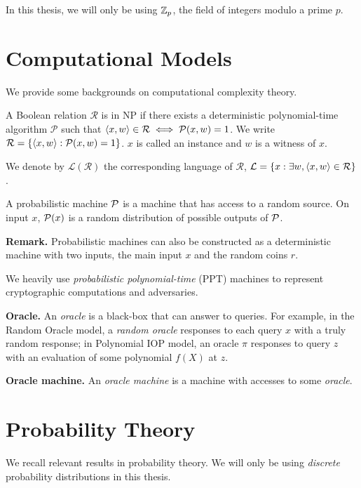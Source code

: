 In this thesis, we will only be using $\mathbb{Z}_p$, the field of integers modulo a prime $p$.

\section{Computational Models}

We provide some backgrounds on computational complexity theory.

\begin{definition}[NP relation]
A Boolean relation $\mathcal{R}$ is in NP if there exists a deterministic polynomial-time algorithm $\mathcal{P}$ such that $\langle x, w \rangle \in \mathcal{R} \iff \mathcal{P}(x, w) = 1$. We write $\mathcal{R} = \{ \langle x, w \rangle : \mathcal{P}(x, w) = 1 \}$. $x$ is called an \textup{instance} and $w$ is a \textup{witness} of $x$.

We denote by $\mathcal{L(R)}$ the corresponding language of $\mathcal{R}$, $\mathcal{L} = \{ x : \exists w, \langle x, w \rangle \in \mathcal{R} \}$. 
\end{definition}

\begin{definition}
A probabilistic machine $\mathcal{P}$ is a machine that has access to a random source. On input $x$, $\mathcal{P}(x)$ is a random distribution of possible outputs of $\mathcal{P}$.
\end{definition}

\textbf{Remark.} Probabilistic machines can also be constructed as a deterministic machine with two inputs, the main input $x$ and the random coins $r$.

We heavily use \textit{probabilistic polynomial-time} (PPT) machines to represent cryptographic computations and adversaries.

\textbf{Oracle.} An \textit{oracle} is a black-box that can answer to queries. For example, in the Random Oracle model, a \textit{random oracle} responses to each query $x$ with a truly random response; in Polynomial IOP model, an oracle $\pi$ responses to query $z$ with an evaluation of some polynomial $f(X)$ at $z$.

\textbf{Oracle machine.} An \textit{oracle machine} is a machine with accesses to some \textit{oracle}.

\section{Probability Theory}

We recall relevant results in probability theory. We will only be using \textit{discrete} probability distributions in this thesis.

